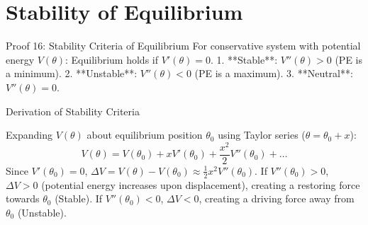 \documentclass[11pt, a4paper]{report}
\begin{document}
\section{Stability of Equilibrium}

\begin{theorembox}{Proof 16: Stability Criteria of Equilibrium}
For conservative system with potential energy $V(\theta)$: Equilibrium holds if $V'(\theta) = 0$.
1. **Stable**: $V''(\theta) > 0$ (PE is a minimum).
2. **Unstable**: $V''(\theta) < 0$ (PE is a maximum).
3. **Neutral**: $V''(\theta) = 0$.
\end{theorembox}

\begin{proofbox}{Derivation of Stability Criteria}
\begin{center}
\end{center}

Expanding $V(\theta)$ about equilibrium position $\theta_0$ using Taylor series ($\theta = \theta_0 + x$):
\[
V(\theta) = V(\theta_0) + x V'(\theta_0) + \frac{x^2}{2} V''(\theta_0) + \dots
\]
Since $V'(\theta_0) = 0$, $\Delta V = V(\theta) - V(\theta_0) \approx \frac{1}{2} x^2 V''(\theta_0)$. If $V''(\theta_0) > 0$, $\Delta V > 0$ (potential energy increases upon displacement), creating a restoring force towards $\theta_0$ (Stable). If $V''(\theta_0) < 0$, $\Delta V < 0$, creating a driving force away from $\theta_0$ (Unstable).
\end{proofbox}
\end{document}
